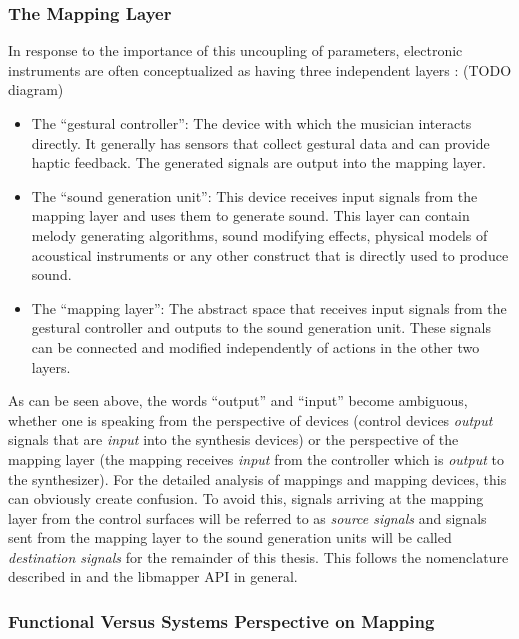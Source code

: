 	\subsubsection{The Mapping Layer}

In response to the importance of this uncoupling of parameters, electronic instruments are often conceptualized as having three independent layers \cite{gestural_control_sound_synthesis}: (TODO diagram)

	\begin{itemize}
		\item The ``gestural controller'': The device with which the musician interacts directly. It generally has sensors that collect gestural data and can provide haptic feedback. The generated signals are output into the mapping layer.
		\item The ``sound generation unit'': This device receives input signals from the mapping layer and uses them to generate sound. This layer can contain melody generating algorithms, sound modifying effects, physical models of acoustical instruments or any other construct that is directly used to produce sound.
		\item The ``mapping layer'': The abstract space that receives input signals from the gestural controller and outputs to the sound generation unit. These signals can be connected and modified independently of actions in the other two layers.
	\end{itemize}

As can be seen above, the words ``output'' and ``input'' become ambiguous, whether one is speaking from the perspective of devices (control devices \emph{output} signals that are \emph{input} into the synthesis devices) or the perspective of the mapping layer (the mapping receives \emph{input} from the controller which is \emph{output} to the synthesizer). For the detailed analysis of mappings and mapping devices, this can obviously create confusion. To avoid this, signals arriving at the mapping layer from the control surfaces will be referred to as \emph{source signals} and signals sent from the mapping layer to the sound generation units will be called \emph{destination signals} for the remainder of this thesis. This follows the nomenclature described in  and the libmapper API in general.

	\subsubsection{Functional Versus Systems Perspective on Mapping}

